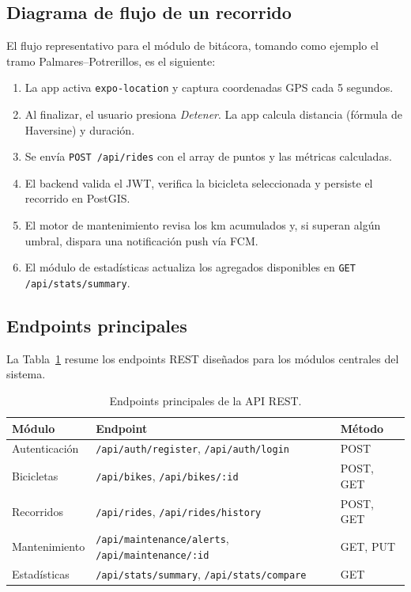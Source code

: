 \documentclass{llncs}
\begin{document}
\subsection{Diagrama de flujo de un recorrido}

El flujo representativo para el módulo de bitácora, tomando como ejemplo el tramo Palmares–Potrerillos, es el siguiente:

\begin{enumerate}
  \item La app activa \texttt{expo-location} y captura coordenadas GPS cada 5 segundos.
  \item Al finalizar, el usuario presiona \textit{Detener}. La app calcula distancia (fórmula de Haversine) y duración.
  \item Se envía \texttt{POST /api/rides} con el array de puntos y las métricas calculadas.
  \item El backend valida el JWT, verifica la bicicleta seleccionada y persiste el recorrido en PostGIS.
  \item El motor de mantenimiento revisa los km acumulados y, si superan algún umbral, dispara una notificación push vía FCM.
  \item El módulo de estadísticas actualiza los agregados disponibles en \texttt{GET /api/stats/summary}.
\end{enumerate}

\subsection{Endpoints principales}

La Tabla~\ref{tab:endpoints} resume los endpoints REST diseñados para los módulos centrales del sistema.

\begin{table}[h]
\caption{Endpoints principales de la API REST.}\label{tab:endpoints}
\begin{tabular}{|l|l|l|}
\hline
\textbf{Módulo} & \textbf{Endpoint} & \textbf{Método} \\
\hline
Autenticación & \texttt{/api/auth/register}, \texttt{/api/auth/login} & POST \\
Bicicletas & \texttt{/api/bikes}, \texttt{/api/bikes/:id} & POST, GET \\
Recorridos & \texttt{/api/rides}, \texttt{/api/rides/history} & POST, GET \\
Mantenimiento & \texttt{/api/maintenance/alerts}, \texttt{/api/maintenance/:id} & GET, PUT \\
Estadísticas & \texttt{/api/stats/summary}, \texttt{/api/stats/compare} & GET \\
\hline
\end{tabular}
\end{table}
\end{document}
